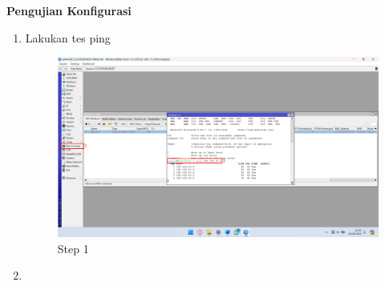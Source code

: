 \begin{center}
    \textbf{Pengujian Konfigurasi}
    \begin{enumerate}
        \item Lakukan tes ping
        \begin{figure}[H]
			\centering
			\includegraphics[width=0.8\linewidth]{P3/img/per1/pc1/Step 4.png}
			\caption{Step 1}
			\label{fig:Ping Step 1(Per.1 PC1)}
		\end{figure}
        \item 
    \end{enumerate}
\end{center}

